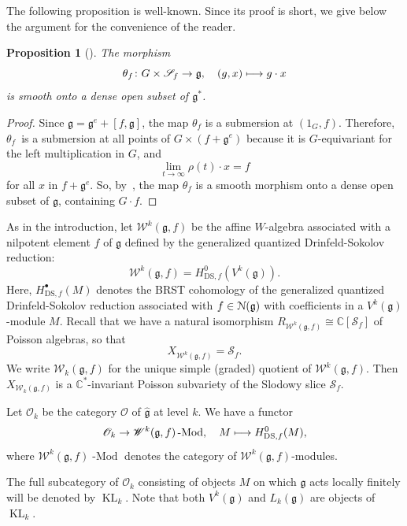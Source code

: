 \documentclass[11pt]{article}
\numberwithin{equation}{section}
\newcommand{\sbullet}{{\scriptscriptstyle\bullet}}
\newcommand\mto{\mathchoice{\longmapsto}{\mapsto}{\mapsto}{\mapsto}}
\newcommand{\DS}{\mathrm{DS}}
\let\mathcal \EuScript
\let\on\operatorname
\newcommand\C{{\mathbb C}}
\newcommand \g{\mathfrak g}
\newcommand \frg{\widehat{\mathfrak{g}}}
\newcommand \W{\mathscr{W}}
\newtheorem{prop}[theorem]{Proposition}
\theoremstyle{definition}
\begin{document}
The following proposition is well-known.
Since its proof is short, we give below
the argument for the convenience of the reader.

\begin{prop}[{\cite{Slo80,Premet02,Charbonnel-Moreau}}]
\label{pro:Slodowy}
The morphism
\[
\theta_f \colon G \times \mathscr{S}_f \to \g,
\quad (g,x) \mto g\cdot x
\]
is smooth onto a dense open subset of $\g^*$.
\end{prop}
\begin{proof}
Since $\g =\g^{e}+[f,\g]$, the map $\theta_f$ is a submersion at
$(1_{G},f)$. Therefore, $\theta _{f}$~is a submersion at all points of
$G\times (f +\g^{e})$ because it is $G$-equivariant for the left
multiplication in $G$, and
\[
\lim _{t \to \infty } \rho(t)\cdot x = f
\]
for all $x$ in $f+\g^{e}$. So, by~\cite[Ch.\,III, Prop.\,10.4]{Hartshorne},
the map $\theta _{f}$ is a smooth morphism onto a dense open subset of
$\g$, containing $G\cdot f$.
\end{proof}

As in the introduction, let $\W^k(\g,f)$ be the {affine $W$-algebra} associated with
a nilpotent element $f$ of $\g$
defined by the generalized quantized Drinfeld-Sokolov reduction:
\[
\W^k(\g,f)=H^{0}_{\DS,f}(V^k(\g)).
\]
Here, $H^{\sbullet}_{\DS,f}(M)$ denotes the BRST
cohomology of the generalized quantized Drinfeld-Sokolov reduction
associated with $f \in \mathcal{N}(\g)$ with coefficients in
a $V^k(\g)$-module $M$.
Recall that we have \cite{DSK06,Ara09b} a natural isomorphism
$R_{\W^k(\g,f)}\cong \C[\mathscr{S}_{f}]$ of Poisson algebras, so that
\begin{equation*}
X_{\W^k(\g,f)}= \mathscr{S}_{f}.
\end{equation*}
We write $\W_k(\g,f)$ for the unique simple (graded) quotient of
$\W^k(\g,f)$. Then $X_{\W_k(\g,f)}$
is a $\C^*$-invariant Poisson
subvariety of the Slodowy slice $\mathscr{S}_f$.

Let $\mathscr{O}_k$ be the category $\mathscr{O}$ of
$\frg$ at level $k$.
We have a functor
\begin{equation*}
\mathscr{O}_k\to\W^k(\g,f)\on{-Mod},\quad M\mto
H^0_{\DS,f}(M),
\end{equation*}
where
$\W^k(\g,f)\on{-Mod}$ denotes the category
of $\W^k(\g,f)$-modules.

The full subcategory of $\mathscr{O}_k$ consisting of
objects $M$ on which $\g$ acts locally finitely will be denoted by $\on{KL}_k$.
Note that both $V^k(\g)$ and $L_k(\g)$ are objects of $\on{KL}_k$.
\end{document}
